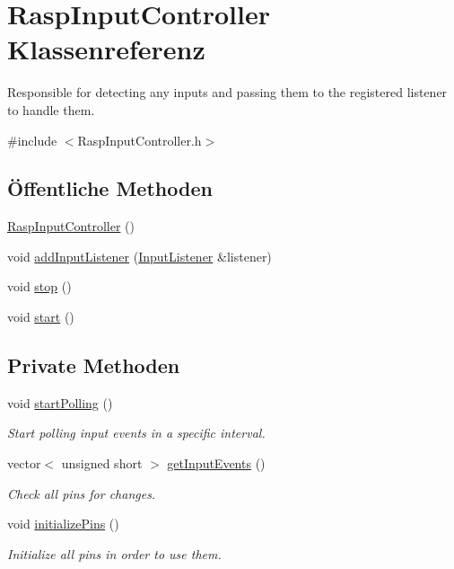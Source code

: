 \hypertarget{class_rasp_input_controller}{}\section{Rasp\+Input\+Controller Klassenreferenz}
\label{class_rasp_input_controller}


Responsible for detecting any inputs and passing them to the registered listener to handle them.  




{\ttfamily \#include $<$Rasp\+Input\+Controller.\+h$>$}

\subsection*{Öffentliche Methoden}
\begin{DoxyCompactItemize}
\item 
\hyperlink{class_rasp_input_controller_a63a9e2ab7d0eb5aed2da6068454caa65}{Rasp\+Input\+Controller} ()
\item 
void \hyperlink{class_rasp_input_controller_a31d6f6befaea44931f0010175bfe1a17}{add\+Input\+Listener} (\hyperlink{class_input_listener}{Input\+Listener} \&listener)
\item 
void \hyperlink{class_rasp_input_controller_a7d9523be1a83acde964cb5d2b1d281ed}{stop} ()
\item 
void \hyperlink{class_rasp_input_controller_a8cb185caa124285987d6b98122cfbea4}{start} ()
\end{DoxyCompactItemize}
\subsection*{Private Methoden}
\begin{DoxyCompactItemize}
\item 
void \hyperlink{class_rasp_input_controller_a7e15590d321b382fcb5f4d70959a5cbe}{start\+Polling} ()
\begin{DoxyCompactList}\small\item\em Start polling input events in a specific interval. \end{DoxyCompactList}\item 
vector$<$ unsigned short $>$ \hyperlink{class_rasp_input_controller_a95a42703b4c0bca34ba966745bad5dff}{get\+Input\+Events} ()
\begin{DoxyCompactList}\small\item\em Check all pins for changes. \end{DoxyCompactList}\item 
void \hyperlink{class_rasp_input_controller_a5ffc6f68b0c74f31a9b595ff8acc49f1}{initialize\+Pins} ()
\begin{DoxyCompactList}\small\item\em Initialize all pins in order to use them. \end{DoxyCompactList}\end{DoxyCompactItemize}
